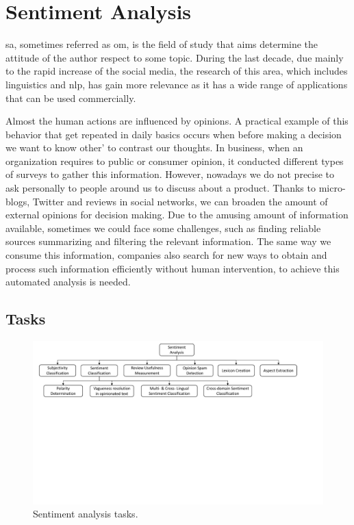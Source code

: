 
\section{Sentiment Analysis}
\label{sec:sentiment_analysis}

\acrfull{sa}, sometimes referred as \acrfull{om}, is the field of study that aims determine the attitude of the author respect to some topic. During the last decade, due mainly to the rapid increase of the social media, the research of this area, which includes linguistics and \acrfull{nlp}, has gain more relevance as it has a wide range of applications that can be used commercially.

Almost the human actions are influenced by opinions. A practical example of this behavior that get repeated in daily basics occurs when before making a decision we want to know other' to contrast our thoughts. In business, when an organization requires to public or consumer opinion, it conducted different types of surveys to gather this information. However, nowadays we do not precise to ask personally to people around us to discuss about a product. Thanks to micro-blogs, Twitter and reviews in social networks, we can broaden the amount of external opinions for decision making. Due to the amusing amount of information available, sometimes we could face some challenges, such as finding reliable sources summarizing and filtering the relevant information. The same way we consume this information, companies also search for new ways to obtain and process such information efficiently without human intervention, to achieve this automated analysis is needed\cite{liu2012sentiment}.

\subsection{Tasks}
\label{subsec:sentiment_analysis_tasks}

\begin{figure}[!htp]
  \center
  \includegraphics[width=1\textwidth]{figures/sentiment_analysis_tasks}
  \caption{Sentiment analysis tasks.}
  \label{fig:sentiment_analysis_tasks}
\end{figure}

